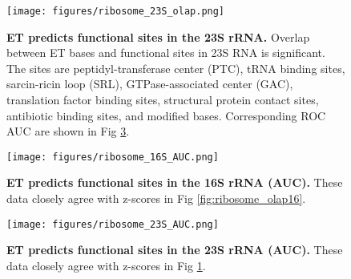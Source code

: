 \documentclass[12pt,a4paper]{report}
\begin{document}
\begin{figure}
\begin{minipage}[c][\textheight]{\textwidth}
\centering
 \vspace{-1.5in}
  \texttt{[image: figures/ribosome\_23S\_olap.png]}
\caption[ET predicts functional sites in the ribosome (23S rRNA).]{\textbf{ET predicts functional sites in the 23S rRNA.} Overlap between ET bases and functional sites in 23S RNA is significant. The sites are peptidyl-transferase center (PTC), tRNA binding sites, sarcin-ricin loop (SRL), GTPase-associated center (GAC), translation factor binding sites, structural protein contact sites, antibiotic binding sites, and modified bases. Corresponding ROC AUC are shown in Fig \ref{fig:ribosome_auc23}.}
\label{fig:ribosome_olap23}
\end{minipage}
\end{figure}

\begin{figure}
\begin{minipage}[c][\textheight]{\textwidth}
\centering
 \vspace{-4in}
  \texttt{[image: figures/ribosome\_16S\_AUC.png]}
\caption[ET predicts functional sites in the ribosome (16S rRNA, AUC).]{\textbf{ET predicts functional sites in the 16S rRNA (AUC).} These data closely agree with z-scores in Fig \ref{fig:ribosome_olap16}.}
 \label{fig:ribosome_auc16}
\end{minipage}
\end{figure}

\begin{figure}
\begin{minipage}[c][\textheight]{\textwidth}
\centering
 \vspace{-4in}
  \texttt{[image: figures/ribosome\_23S\_AUC.png]}
\caption[ET predicts functional sites in the ribosome (23S rRNA, AUC).]{\textbf{ET predicts functional sites in the 23S rRNA (AUC).} These data closely agree with z-scores in Fig \ref{fig:ribosome_olap23}.}
\label{fig:ribosome_auc23}
\end{minipage}
\end{figure}
\end{document}
